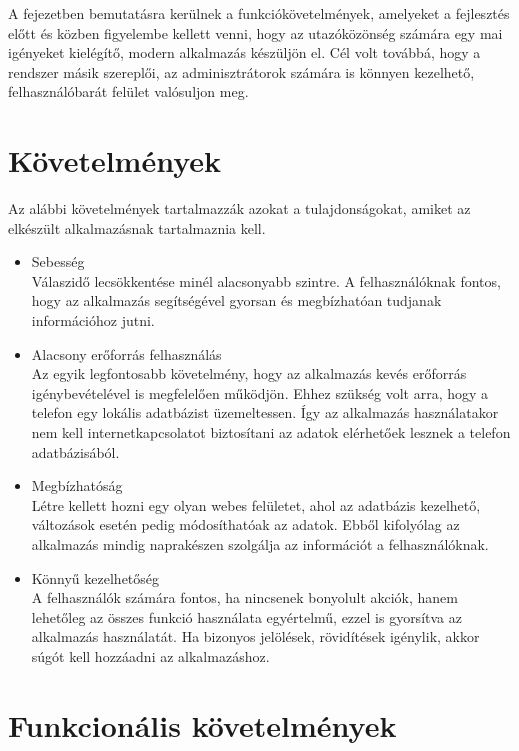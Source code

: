 
A fejezetben bemutatásra kerülnek a funkciókövetelmények, amelyeket a fejlesztés előtt és közben figyelembe kellett venni, hogy az utazóközönség számára egy mai igényeket kielégítő, modern alkalmazás készüljön el.  
Cél volt továbbá, hogy a rendszer másik szereplői, az adminisztrátorok számára is könnyen kezelhető, felhasználóbarát felület valósuljon meg.

\section{Követelmények}
\label{kovetelmeny}

Az alábbi követelmények tartalmazzák azokat a tulajdonságokat, amiket az elkészült alkalmazásnak tartalmaznia kell.

\begin{itemize}
	\item Sebesség
	\\
	Válaszidő lecsökkentése minél alacsonyabb szintre. 
	A felhasználóknak fontos, hogy az alkalmazás segítségével gyorsan és megbízhatóan tudjanak információhoz jutni. 
	\item Alacsony erőforrás felhasználás
	\\
	Az egyik legfontosabb követelmény, hogy az alkalmazás kevés erőforrás igénybevételével is megfelelően működjön. 
	Ehhez szükség volt arra, hogy a telefon egy lokális adatbázist üzemeltessen. 
	Így az alkalmazás használatakor nem kell internetkapcsolatot biztosítani az adatok elérhetőek lesznek a telefon adatbázisából.	
	\item Megbízhatóság
	\\
	Létre kellett hozni egy olyan webes felületet, ahol az adatbázis kezelhető, változások esetén pedig módosíthatóak az adatok. 
	Ebből kifolyólag az alkalmazás mindig naprakészen szolgálja az információt a felhasználóknak.
	\item Könnyű kezelhetőség
	\\
	A felhasználók számára fontos, ha nincsenek bonyolult akciók, hanem lehetőleg az összes funkció használata egyértelmű, ezzel is gyorsítva az alkalmazás használatát. 
	Ha bizonyos jelölések, rövidítések igénylik, akkor súgót kell hozzáadni az alkalmazáshoz.
	
\end{itemize}


\section{Funkcionális követelmények}
\label{funkckov}

